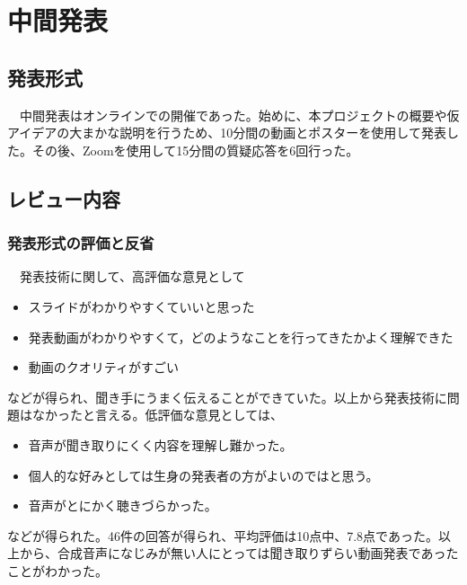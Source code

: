 \chapter{中間発表}

\section{発表形式}
　中間発表はオンラインでの開催であった。始めに、本プロジェクトの概要や仮アイデアの大まかな説明を行うため、10分間の動画とポスターを使用して発表した。その後、Zoomを使用して15分間の質疑応答を6回行った。

\section{レビュー内容}
\subsection{発表形式の評価と反省}
　発表技術に関して、高評価な意見として
\begin{itemize}
    \item スライドがわかりやすくていいと思った
    \item 発表動画がわかりやすくて，どのようなことを行ってきたかよく理解できた
    \item 動画のクオリティがすごい
\end{itemize}
などが得られ、聞き手にうまく伝えることができていた。以上から発表技術に問題はなかったと言える。低評価な意見としては、
\begin{itemize}
    \item 音声が聞き取りにくく内容を理解し難かった。
    \item 個人的な好みとしては生身の発表者の方がよいのではと思う。
    \item 音声がとにかく聴きづらかった。
\end{itemize}
などが得られた。46件の回答が得られ、平均評価は10点中、7.8点であった。以上から、合成音声になじみが無い人にとっては聞き取りずらい動画発表であったことがわかった。

